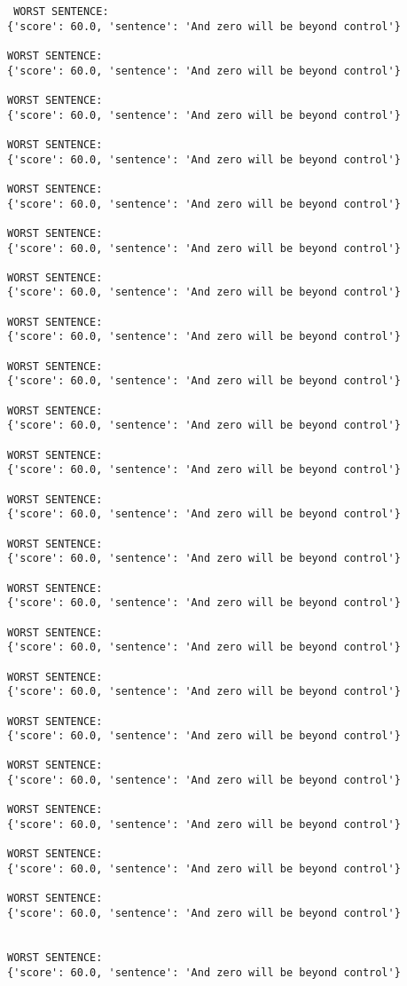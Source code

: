 \documentclass[12pt,a4paper,oneside]{book}
\begin{document}
\begin{verbatim}
 WORST SENTENCE:
{'score': 60.0, 'sentence': 'And zero will be beyond control'}

WORST SENTENCE:
{'score': 60.0, 'sentence': 'And zero will be beyond control'}

WORST SENTENCE:
{'score': 60.0, 'sentence': 'And zero will be beyond control'}

WORST SENTENCE:
{'score': 60.0, 'sentence': 'And zero will be beyond control'}

WORST SENTENCE:
{'score': 60.0, 'sentence': 'And zero will be beyond control'}

WORST SENTENCE:
{'score': 60.0, 'sentence': 'And zero will be beyond control'}

WORST SENTENCE:
{'score': 60.0, 'sentence': 'And zero will be beyond control'}

WORST SENTENCE:
{'score': 60.0, 'sentence': 'And zero will be beyond control'}

WORST SENTENCE:
{'score': 60.0, 'sentence': 'And zero will be beyond control'}

WORST SENTENCE:
{'score': 60.0, 'sentence': 'And zero will be beyond control'}

WORST SENTENCE:
{'score': 60.0, 'sentence': 'And zero will be beyond control'}

WORST SENTENCE:
{'score': 60.0, 'sentence': 'And zero will be beyond control'}

WORST SENTENCE:
{'score': 60.0, 'sentence': 'And zero will be beyond control'}

WORST SENTENCE:
{'score': 60.0, 'sentence': 'And zero will be beyond control'}

WORST SENTENCE:
{'score': 60.0, 'sentence': 'And zero will be beyond control'}

WORST SENTENCE:
{'score': 60.0, 'sentence': 'And zero will be beyond control'}

WORST SENTENCE:
{'score': 60.0, 'sentence': 'And zero will be beyond control'}

WORST SENTENCE:
{'score': 60.0, 'sentence': 'And zero will be beyond control'}

WORST SENTENCE:
{'score': 60.0, 'sentence': 'And zero will be beyond control'}

WORST SENTENCE:
{'score': 60.0, 'sentence': 'And zero will be beyond control'}

WORST SENTENCE:
{'score': 60.0, 'sentence': 'And zero will be beyond control'}
 
 
WORST SENTENCE:
{'score': 60.0, 'sentence': 'And zero will be beyond control'}


\end{verbatim}
\end{document}
